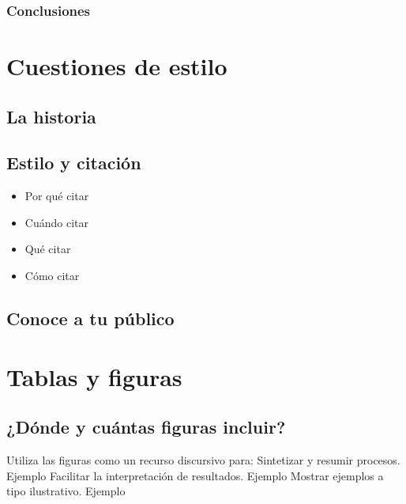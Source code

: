 \documentclass[
]{book}
\providecommand{\tightlist}{%
  \setlength{\itemsep}{0pt}\setlength{\parskip}{0pt}}
\begin{document}
\hypertarget{conclusiones}{%
\subsection{Conclusiones}\label{conclusiones}}

\hypertarget{cuestiones-de-estilo}{%
\chapter{Cuestiones de estilo}\label{cuestiones-de-estilo}}

\hypertarget{la-historia}{%
\section{La historia}\label{la-historia}}

\hypertarget{estilo-y-citaciuxf3n}{%
\section{Estilo y citación}\label{estilo-y-citaciuxf3n}}

\begin{itemize}
\tightlist
\item
  Por qué citar
\item
  Cuándo citar
\item
  Qué citar
\item
  Cómo citar
\end{itemize}

\hypertarget{conoce-a-tu-puxfablico}{%
\section{Conoce a tu público}\label{conoce-a-tu-puxfablico}}

\hypertarget{tablas-y-figuras}{%
\chapter{Tablas y figuras}\label{tablas-y-figuras}}

\hypertarget{duxf3nde-y-cuuxe1ntas-figuras-incluir}{%
\section{¿Dónde y cuántas figuras incluir?}\label{duxf3nde-y-cuuxe1ntas-figuras-incluir}}

Utiliza las figuras como un recurso discursivo para:
Sintetizar y resumir procesos. Ejemplo
Facilitar la interpretación de resultados. Ejemplo
Mostrar ejemplos a tipo ilustrativo. Ejemplo
\end{document}
